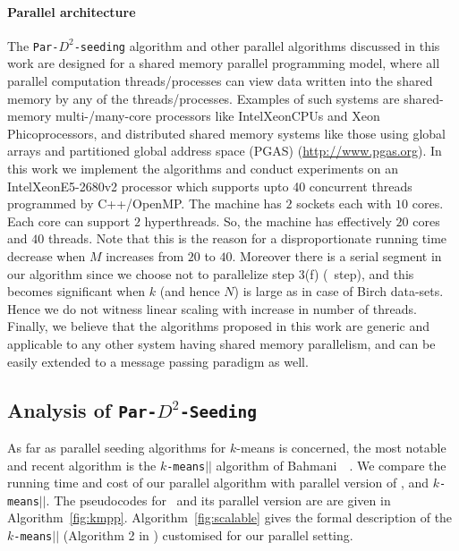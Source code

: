 \paragraph{Parallel architecture} The {\tt Par-$D^{2}$-seeding} algorithm and other parallel algorithms discussed in this work are designed for a shared memory parallel programming model, where all parallel computation threads/processes can view data written into the shared memory by any of the threads/processes.
Examples of such systems are shared-memory multi-/many-core processors like Intel\textregistered Xeon\textregistered CPUs and Xeon Phi\texttrademark  coprocessors, and distributed shared memory systems like those using global arrays and partitioned global address space (PGAS) (\url{http://www.pgas.org}).    
In this work we implement the algorithms and conduct experiments on an Intel\textregistered Xeon\textregistered E5-2680v2 processor which supports upto 40 concurrent threads programmed by C++/OpenMP. 
The machine has $2$ sockets each with $10$ cores. Each core can support $2$ hyperthreads. 
So, the machine has effectively $20$ cores and $40$ threads. 
Note that this is the reason for a disproportionate running time decrease when $M$ increases from $20$ to $40$.
Moreover there is a serial segment in our algorithm since we choose not to parallelize step 3(f) (\kmpp\ step), and this becomes significant when $k$ (and hence $N$) is large as in case of Birch data-sets. 
Hence we do not witness linear scaling with increase in number of threads.
Finally, we believe that the algorithms proposed in this work are generic and applicable to any other system having shared memory parallelism, and can be easily extended to a message passing paradigm as well.





















\subsection{Analysis of \texttt{Par-$D^2$-Seeding}}
As far as parallel seeding algorithms for $k$-means is concerned, the most notable and recent algorithm is the {\tt $k$-means$||$} algorithm of Bahmani~\etal~\cite{bahmani}.
We compare the running time and cost of our parallel algorithm with parallel version of \kmpp, and \texttt{$k$-means$||$}. 
The pseudocodes for \kmpp\ and its parallel version are are given in Algorithm~\ref{fig:kmpp}. 
Algorithm~\ref{fig:scalable} gives the formal description of the {\tt $k$-means$||$} (Algorithm 2 in \cite{bahmani}) customised for our parallel setting.

